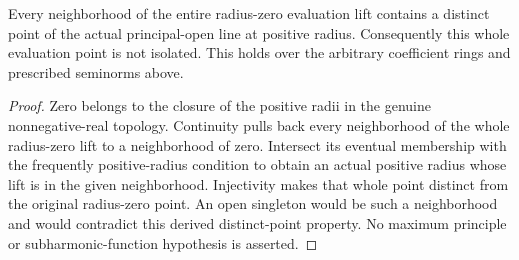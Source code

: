 \begin{theorem}
\label{spectrum:line-evaluation-not-isolated}
\leanok
{}
Every neighborhood of the entire radius-zero evaluation lift contains
a distinct point of the actual principal-open line at positive radius.
Consequently this whole evaluation point is not isolated. This holds
over the arbitrary coefficient rings and prescribed seminorms above.
\end{theorem}
\begin{proof}
Zero belongs to the closure of the positive radii in the genuine
nonnegative-real topology. Continuity pulls back every neighborhood
of the whole radius-zero lift to a neighborhood of zero.
Intersect its eventual membership with the frequently positive-radius
condition to obtain an actual positive radius whose lift is in the
given neighborhood. Injectivity makes that whole point distinct from
the original radius-zero point. An open singleton would be such a
neighborhood and would contradict this derived distinct-point property.
No maximum principle or subharmonic-function hypothesis is asserted.
\end{proof}

